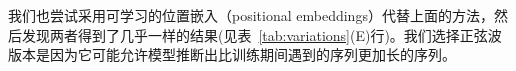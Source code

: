 
我们也尝试采用可学习的位置嵌入（positional embeddings）\citep{JonasFaceNet2017}代替上面的方法，然后发现两者得到了几乎一样的结果(见表~\ref{tab:variations}(E)行)。我们选择正弦波版本是因为它可能允许模型推断出比训练期间遇到的序列更加长的序列。